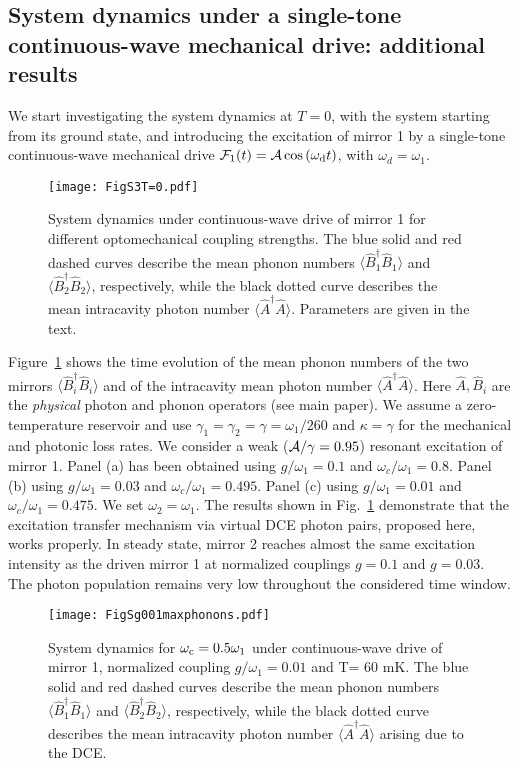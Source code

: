 \documentclass[aps,pra,twocolumn,floatfix,longbibliography, superscriptaddress]{revtex4-1}
\begin{document}
\subsection{System dynamics under a single-tone continuous-wave mechanical drive: additional results}
\label{Subsec:D}
We start investigating the system dynamics at  $T=0$, with the system starting from its ground state, and introducing the excitation of mirror 1 by a single-tone continuous-wave mechanical drive
${\cal F}_1(t) = {\cal A} \cos{(\omega_{\rm d} t)}$, with $\omega_d = \omega_1$.
\begin{figure}
	\centering
	\texttt{[image: FigS3T=0.pdf]}
	\caption{System dynamics under continuous-wave drive of  mirror 1 for different optomechanical coupling strengths. The blue solid and red dashed curves	describe   the mean phonon numbers $\langle \hat B_1^\dag \hat B_1^{} \rangle$ and $\langle \hat B_2^\dag \hat B_2^{} \rangle$, respectively, while the black dotted curve describes the mean intracavity photon number $\langle \hat A^\dag \hat A \rangle$. Parameters are given in the text.
		\label{figS:3}}
\end{figure}
Figure~\ref{figS:3} shows the time evolution of the mean phonon numbers of the two mirrors $\langle \hat B_i^\dag \hat B_i \rangle$ and of the  intracavity mean photon number $\langle \hat A^\dag \hat A \rangle$. Here $\hat A, \hat B_i$ are the {\em physical} photon and phonon operators (see main paper).
We assume a zero-temperature reservoir and use  $\gamma_1 = \gamma_2 = \gamma=  \omega_1 /260$ and $\kappa =  \gamma$ for the mechanical and photonic  loss rates. We consider a weak (${\cal A}/\gamma = 0.95$) resonant excitation of  mirror 1.
Panel (a) has been obtained using $g/\omega_1=0.1$ and $\omega_c / \omega_1 = 0.8$. Panel (b) using $g/\omega_1=0.03$ and $\omega_c / \omega_1 = 0.495$. Panel (c) using $g/\omega_1=0.01$ and $\omega_c / \omega_1 = 0.475$.
We set $\omega_2 = \omega_1$. The results shown in Fig.~\ref{figS:3} demonstrate that the excitation transfer mechanism via  virtual DCE photon pairs, proposed here, works properly. In steady state, mirror 2 reaches almost the same excitation intensity as the driven mirror 1 at normalized couplings $g=0.1$ and $g=0.03$. 
The photon population remains very low throughout the considered time window.
\begin{figure}[H]
	\centering
	\texttt{[image: FigSg001maxphonons.pdf]}
	\caption{System dynamics for $\omega_{\rm c} = 0.5 \omega_{1}$ under continuous-wave drive of  mirror 1, normalized coupling  $g/ \omega_{1} = 0.01$ and T= $60$ mK. The blue solid and red dashed curves
		describe   the mean phonon numbers $\langle \hat B_1^\dag \hat B_1^{} \rangle$ and $\langle \hat B_2^\dag \hat B_2^{} \rangle$, respectively, while the black dotted curve describes the mean intracavity photon number $\langle \hat A^\dag \hat A \rangle$ arising due to the DCE.
		\label{figS:4}}
\end{figure}
\end{document}
